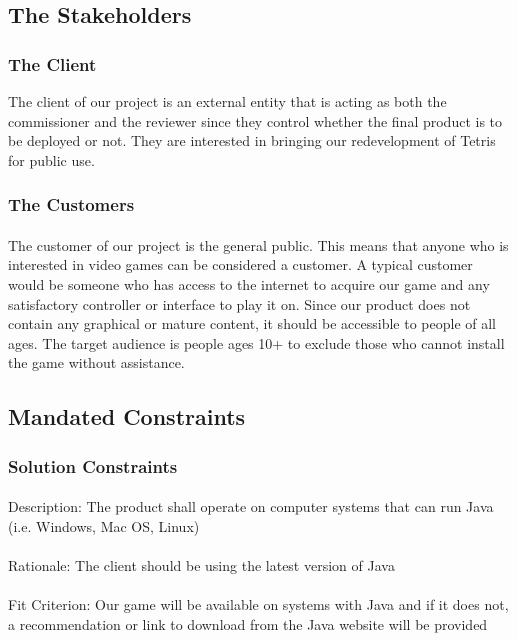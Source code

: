 \documentclass[12pt, titlepage]{article}
\begin{document}
\subsection{The Stakeholders}

\subsubsection{The Client}

The client of our project is an external entity that is acting as both the commissioner and the reviewer since they control whether the final product is to be deployed or not. They are interested in bringing our redevelopment of Tetris for public use.
\subsubsection{The Customers}
\paragraph{}
The customer of our project is the general public. This means that anyone who is interested in video games can be considered a customer. A typical customer would be someone who has access to the internet to acquire our game and any satisfactory controller or interface to play it on. Since our product does not contain any graphical or mature content, it should be accessible to people of all ages. The target audience is people ages 10+ to exclude those who cannot install the game without assistance.

\subsection{Mandated Constraints}
\subsubsection{Solution Constraints}
\paragraph{}
Description: The product shall operate on computer systems that can run Java (i.e. Windows, Mac OS, Linux)
\paragraph{}
Rationale: The client should be using the latest version of Java
\paragraph{}
Fit Criterion: Our game will be available on systems with Java and if it does not, a recommendation or link to download from the Java website will be provided
\end{document}
